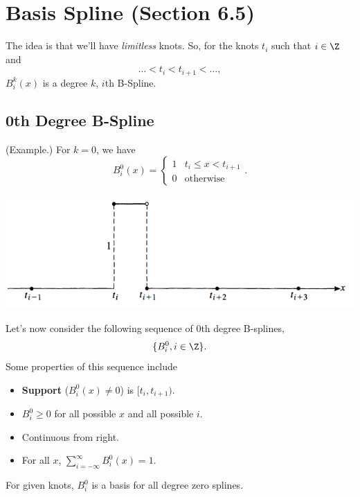 \documentclass[letterpaper]{article}
\begin{document}
\section{Basis Spline (Section 6.5)}
The idea is that we'll have \emph{limitless} knots. So, for the knots $t_i$ such that $i \in \Z$ and \[\hdots < t_i < t_{i + 1} < \hdots,\] $B_{i}^{k}(x)$ is a degree $k$, $i$th B-Spline. 

\subsection{0th Degree B-Spline}
\begin{mdframed}
    (Example.) For $k = 0$, we have 
    \[B_{i}^{0}(x) = \begin{cases}
        1 & t_{i} \leq x < t_{i + 1} \\ 
        0 & \text{otherwise}
    \end{cases}.\]

    \begin{center}
        \includegraphics[scale=0.8]{../assets/bspline_1.png}
    \end{center}
\end{mdframed}

Let's now consider the following sequence of 0th degree B-splines, 
\[\{B_{i}^0, i \in \Z\}.\]
Some properties of this sequence include 
\begin{itemize}
    \item \textbf{Support} ($B_{i}^0 (x) \neq 0$) is $[t_i, t_{i + 1})$. 
    \item $B_{i}^0 \geq 0$ for all possible $x$ and all possible $i$.
    \item Continuous from right. 
    \item For all $x$, $\sum_{i = -\infty}^{\infty} B_{i}^{0}(x) = 1.$
\end{itemize}
For given knots, $B_{i}^0$ is a basis for all degree zero splines.
\end{document}
